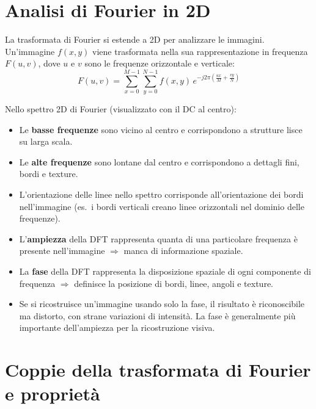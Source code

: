 \documentclass[12pt, a4paper]{report}
\begin{document}
\section{Analisi di Fourier in 2D}

La trasformata di Fourier si estende a 2D per analizzare le immagini.  Un'immagine
$f(x,y)$ viene trasformata nella sua rappresentazione in frequenza $F(u,v)$, dove
$u$ e $v$ sono le frequenze orizzontale e verticale:
\[
  F(u,v) = \sum_{x=0}^{M-1}\sum_{y=0}^{N-1}
    f(x,y)\,e^{-j2\pi\!\left(\frac{ux}{M}+\frac{vy}{N}\right)}
\]

Nello spettro 2D di Fourier (visualizzato con il DC al centro):
\begin{itemize}
  \item Le \textbf{basse frequenze} sono vicino al centro e corrispondono a strutture
        lisce su larga scala.
  \item Le \textbf{alte frequenze} sono lontane dal centro e corrispondono a dettagli
        fini, bordi e texture.
  \item L'orientazione delle linee nello spettro corrisponde all'orientazione dei
        bordi nell'immagine (es.\ i bordi verticali creano linee orizzontali nel
        dominio delle frequenze).
\end{itemize}

\begin{notebox}
\begin{itemize}
  \item L'\textbf{ampiezza} della DFT rappresenta quanta di una particolare frequenza
        è presente nell'immagine $\Rightarrow$ manca di informazione spaziale.
  \item La \textbf{fase} della DFT rappresenta la disposizione spaziale di ogni
        componente di frequenza $\Rightarrow$ definisce la posizione di bordi, linee,
        angoli e texture.
  \item Se si ricostruisce un'immagine usando solo la fase, il risultato è
        riconoscibile ma distorto, con strane variazioni di intensità.  La fase è
        generalmente più importante dell'ampiezza per la ricostruzione visiva.
\end{itemize}
\end{notebox}

\section{Coppie della trasformata di Fourier e proprietà}
\end{document}
